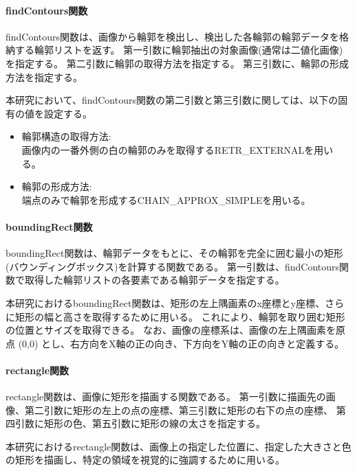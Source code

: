 \paragraph{findContours関数}
findContours関数は、画像から輪郭を検出し、検出した各輪郭の輪郭データを格納する輪郭リストを返す。
第一引数に輪郭抽出の対象画像(通常は二値化画像)を指定する。
第二引数に輪郭の取得方法を指定する。
第三引数に、輪郭の形成方法を指定する。
\par
本研究において、findContours関数の第二引数と第三引数に関しては、以下の固有の値を設定する。
\begin{itemize}
      \setlength{\itemsep}{0pt}
            \setlength{\parsep}{0pt}
      \item 輪郭構造の取得方法:\\
            画像内の一番外側の白の輪郭のみを取得するRETR\_EXTERNAL\cite{RetrExternal}を用いる。
      \item 輪郭の形成方法:\\
            端点のみで輪郭を形成するCHAIN\_APPROX\_SIMPLE\cite{ChainApproxSimple}を用いる。
\end{itemize}
\par
\paragraph{boundingRect関数}
boundingRect関数は、輪郭データをもとに、その輪郭を完全に囲む最小の矩形(バウンディングボックス)を計算する関数である。
第一引数は、findContours関数で取得した輪郭リストの各要素である輪郭データを指定する。
\par
本研究におけるboundingRect関数は、矩形の左上隅画素のx座標とy座標、さらに矩形の幅と高さを取得するために用いる。
これにより、輪郭を取り囲む矩形の位置とサイズを取得できる。
なお、画像の座標系は、画像の左上隅画素を原点 (0,0) とし、右方向をX軸の正の向き、下方向をY軸の正の向きと定義する。
\paragraph{rectangle関数}
rectangle関数は、画像に矩形を描画する関数である。
第一引数に描画先の画像、第二引数に矩形の左上の点の座標、第三引数に矩形の右下の点の座標、
第四引数に矩形の色、第五引数に矩形の線の太さを指定する。
\par
本研究におけるrectangle関数は、画像上の指定した位置に、指定した大きさと色の矩形を描画し、特定の領域を視覚的に強調するために用いる。
